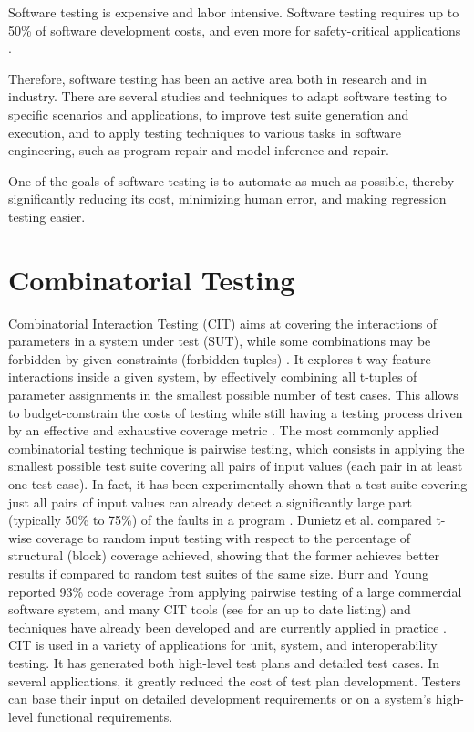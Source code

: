 \documentclass[
12pt, %
oneside, %
english, %
singlespacing, %
headsepline, %
consistentlayout, %
]{MastersDoctoralThesis} %
\theoremstyle{plain}
\theoremstyle{definition}
\theoremstyle{remark}
\theoremstyle{plain}
\theoremstyle{plain}
\theoremstyle{remark}
\begin{document}
Software testing is expensive and labor intensive. Software testing requires up to 50\% of software development costs, and even more for safety-critical applications \cite{testingbook}.

Therefore, software testing has been an active area both in research and in industry.
There are several studies and techniques to adapt software testing to specific scenarios and applications, to improve test suite generation and execution, and to apply testing techniques to various tasks in software engineering, such as program repair and model inference and repair. 

One of the goals of software testing is to automate as much as possible, thereby significantly reducing its cost, minimizing human error, and making regression testing easier. \cite{testingbook}

\section{Combinatorial Testing}
Combinatorial Interaction Testing (CIT) aims at covering the interactions of parameters in a system under test (SUT), while some combinations may be forbidden by given constraints (forbidden tuples) \cite{yamada_greedy_2016}.
It explores t-way feature interactions inside a given system, by effectively combining all t-tuples of parameter assignments in the smallest possible number of test cases.
This allows to budget-constrain the costs of testing while still having a testing process driven by an effective and exhaustive coverage metric \cite{AETG,KuhnTSE04}. 
The most commonly applied combinatorial testing technique is pairwise testing, which consists in applying the smallest possible test suite covering all pairs of input values (each pair in at least one test case). 
In fact, it has been experimentally shown that a test suite covering just all pairs of input values can already detect a significantly large part (typically 50\% to 75\%) of the faults in a program \cite{Dalal:ICSE99, IPO}.
Dunietz et al. \cite{Dunietz:ICSE97} compared t-wise coverage to random input testing with respect to the percentage of structural (block) coverage achieved, showing that the former achieves better results if compared to random test suites of the same size. 
Burr and Young \cite{burr98} reported 93\% code coverage from applying pairwise testing of a large commercial software system, and many CIT tools (see \cite{pairwise} for an up to date listing) and techniques have already been developed \cite{AETGT.ISSRE.1998,GrindalSTVR05,KuhnTSE04} and are currently applied in practice \cite{OATS,Kuhn02,Smith}. 
CIT is used in a variety of applications for unit, system, and interoperability testing. 
It has generated both high-level test plans and detailed test cases. In several applications, it greatly reduced the cost of test plan development. Testers can base their input on detailed development requirements or on a system's high-level functional requirements.
\end{document}

